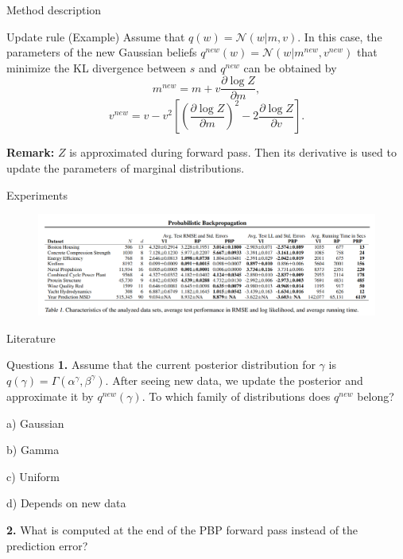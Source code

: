 \documentclass[13pt]{beamer}				\usepackage{graphicx}
\begin{document}
\begin{frame}{Method description}
\begin{block}{Update rule (Example)}
Assume that $q(w) = \mathcal{N}(w|m, v)$. In this case, the parameters of the new Gaussian beliefs $q^{new}(w) = \mathcal{N}(w|m^{new}, v^{new})$ that minimize the KL divergence between $s$ and $q^{new}$ can be obtained by 
$$m^{new} = m + v \frac{\partial \log Z}{\partial m},$$
$$v^{new} = v - v^2 \left [ \left ( \frac{\partial \log Z}{\partial m}\right)^2 - 2 \frac{\partial \log Z}{\partial v} \right ].$$
\end{block}
\pause
\textbf{Remark:} $Z$ is approximated during forward pass. Then its derivative is used to update the parameters of marginal distributions. 
\end{frame}


\begin{frame}{Experiments}
\begin{figure}[h!]
    \includegraphics[width=1\textwidth, trim={0 0 0 0cm},clip]{experiments.png}
\end{figure}
\end{frame}

\begin{frame}{Literature}
\nocite{*}
\printbibliography
\end{frame}

\begin{frame}{Questions}
\textbf{1.}
Assume that the current posterior distribution for $\gamma$ is $q(\gamma) = \Gamma (\alpha^{\gamma}, \beta^{\gamma})$. After seeing new data, we update the posterior and approximate it by $q^{new}(\gamma)$. To which family of distributions does $q^{new}$ belong?

a) Gaussian

b) Gamma

c) Uniform

d) Depends on new data

\textbf{2.}
What is computed at the end of the PBP forward pass instead of the prediction error?
\end{frame}
\end{document}
